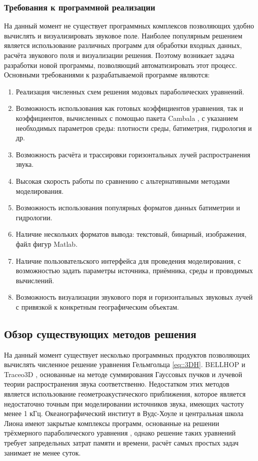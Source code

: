 \documentclass[../document.tex]{subfiles}
\begin{document}
        \subsubsection{Требования к программной реализации}
            \par На данный момент не существует программных комплексов позволяющих удобно вычислять и визуализировать звуковое поле. Наиболее популярным решением является использование различных программ для обработки входных данных, расчёта звукового поля и визуализации решения. Поэтому возникает задача разработки новой программы, позволяющий автоматизировать этот процесс. Основными требованиями к разрабатываемой программе являются:
            \begin{enumerate}
                \item Реализация численных схем решения модовых параболических уравнений.
                \item Возможность использования как готовых коэффициентов уравнения, так
и коэффициентов, вычисленных с помощью пакета Cambala \cite{cambala}, с указанием необхо­димых параметров среды: плотности среды, батиметрия, гидрология и др.
                \item Возможность расчёта и трассировки горизонтальных лучей распространения звука.
                \item Высокая скорость работы по сравнению с альтернативными методами моделирования.
                \item Возможность использования популярных форматов данных батиметрии и гидрологии.
                \item Наличие нескольких форматов вывода: текстовый, бинарный, изображения, файл фигур Matlab.
                \item Наличие пользовательского интерфейса для проведения моделирования, с возможностью задать параметры источника, приёмника, среды и проводимых вычислений.
                \item Возможность визуализации звукового поря и горизонтальных звуковых лучей с привязкой к конкретным географическим объектам.
            \end{enumerate}
    \subsection{Обзор существующих методов решения}
        \par На данный момент существует несколько программных продуктов позволяющих вычислять численное решение уравнения Гельмгольца \eqref{eq::3DH}. BELLHOP \cite{bellhop} и Traceo3D \cite{traceo}, основанные на методе суммирования Гауссовых пучков и лучевой теории распространения звука соответственно. Недостатком этих методов является использование геометроакустического приближения, которое является недостаточно точным при моделировании источников звука, имеющих частоту менее 1 кГц. Океанографический институт в Вудс-Хоуле \cite{whoi} и центральная школа Лиона \cite{lyon} имеют закрытые комплексы программ, основанные на решении трёхмерного параболического уравнения \cite{isakson14,lin12,shtrum16}, однако решение таких уравнений требует запредельных затрат памяти и времени, расчёт самых простых задач занимает не менее суток.
\end{document}
